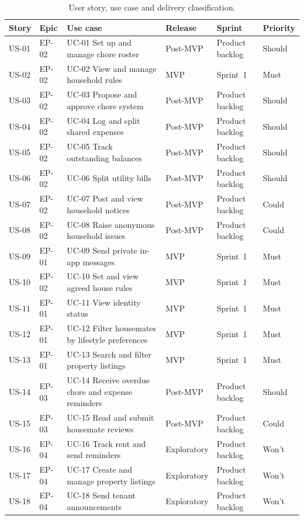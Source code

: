 \documentclass[11pt,a4paper]{article}
\begin{document}
\begin{table}[H]
    \centering
    \footnotesize
    \caption{User story, use case and delivery classification.}
    \begin{tabularx}{\textwidth}{@{}L{1.05cm}L{1.0cm}Y L{1.75cm}L{1.8cm}L{1.2cm}@{}}
        \toprule
        Story & Epic & Use case & Release & Sprint & Priority\\
        \midrule
        US-01 & EP-02 & UC-01 Set up and manage chore roster & Post-MVP & Product backlog & Should\\
        US-02 & EP-02 & UC-02 View and manage household rules & MVP & Sprint~1 & Must\\
        US-03 & EP-02 & UC-03 Propose and approve chore system & Post-MVP & Product backlog & Should\\
        US-04 & EP-02 & UC-04 Log and split shared expenses & Post-MVP & Product backlog & Should\\
        US-05 & EP-02 & UC-05 Track outstanding balances & Post-MVP & Product backlog & Should\\
        US-06 & EP-02 & UC-06 Split utility bills & Post-MVP & Product backlog & Should\\
        US-07 & EP-02 & UC-07 Post and view household notices & Post-MVP & Product backlog & Could\\
        US-08 & EP-02 & UC-08 Raise anonymous household issues & Post-MVP & Product backlog & Could\\
        US-09 & EP-01 & UC-09 Send private in-app messages & MVP & Sprint~1 & Must\\
        US-10 & EP-02 & UC-10 Set and view agreed house rules & MVP & Sprint~1 & Must\\
        US-11 & EP-01 & UC-11 View identity status & MVP & Sprint~1 & Must\\
        US-12 & EP-01 & UC-12 Filter housemates by lifestyle preferences & MVP & Sprint~1 & Must\\
        US-13 & EP-01 & UC-13 Search and filter property listings & MVP & Sprint~1 & Must\\
        US-14 & EP-03 & UC-14 Receive overdue chore and expense reminders & Post-MVP & Product backlog & Should\\
        US-15 & EP-03 & UC-15 Read and submit housemate reviews & Post-MVP & Product backlog & Could\\
        US-16 & EP-04 & UC-16 Track rent and send reminders & Exploratory & Product backlog & Won't\\
        US-17 & EP-04 & UC-17 Create and manage property listings & Exploratory & Product backlog & Won't\\
        US-18 & EP-04 & UC-18 Send tenant announcements & Exploratory & Product backlog & Won't\\
        \bottomrule
    \end{tabularx}
    \label{tabusucmapping}
\end{table}
\end{document}
